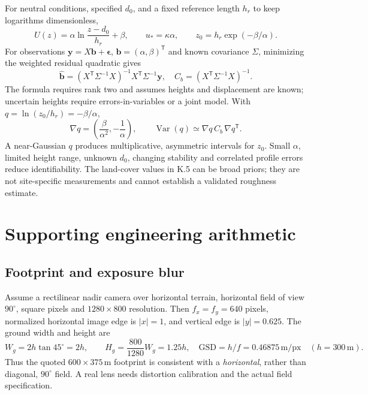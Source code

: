 For neutral conditions, specified $d_0$, and a fixed reference length
$h_r$ to keep logarithms dimensionless,
\begin{equation}
 U(z)=\alpha\ln\frac{z-d_0}{h_r}+\beta,
 \qquad u_*=\kappa\alpha,\qquad
 z_0=h_r\exp(-\beta/\alpha).
\end{equation}
For observations $\boldsymbol y=X\boldsymbol b+\boldsymbol\epsilon$,
$\boldsymbol b=(\alpha,\beta)^{\mathsf T}$ and known covariance $\Sigma$,
minimizing the weighted residual quadratic gives
\begin{equation}
 \widehat{\boldsymbol b}=(X^{\mathsf T}\Sigma^{-1}X)^{-1}
                   X^{\mathsf T}\Sigma^{-1}\boldsymbol y,
 \quad C_b=(X^{\mathsf T}\Sigma^{-1}X)^{-1}.
\end{equation}
The formula requires rank two and assumes heights and displacement are
known; uncertain heights require errors-in-variables or a joint model.
With $q=\ln(z_0/h_r)=-\beta/\alpha$,
\begin{equation}
 \nabla q=\left(\frac{\beta}{\alpha^2},-\frac1\alpha\right),
 \qquad \operatorname{Var}(q)\simeq\nabla q\,C_b\,\nabla q^{\mathsf T}.
\end{equation}
A near-Gaussian $q$ produces multiplicative, asymmetric intervals for
$z_0$. Small $\alpha$, limited height range, unknown $d_0$, changing
stability and correlated profile errors reduce identifiability. The
land-cover values in K.5 can be broad priors; they are not site-specific
measurements and cannot establish a validated roughness estimate.

\section{Supporting engineering arithmetic}
\label{sec:engineering}

\subsection{Footprint and exposure blur}

Assume a rectilinear nadir camera over horizontal terrain, horizontal
field of view $90^\circ$, square pixels and $1280\times800$ resolution.
Then $f_x=f_y=640$ pixels, normalized horizontal image edge is $|x|=1$,
and vertical edge is $|y|=0.625$. The ground width and height are
\begin{equation}
 W_g=2h\tan45^\circ=2h,\qquad
 H_g=\frac{800}{1280}W_g=1.25h,
 \quad \mathrm{GSD}=h/f=0.46875\,\mathrm{m/px}\quad(h=300\,\mathrm m).
\end{equation}
Thus the quoted $600\times375\,\mathrm m$ footprint is consistent with
a \emph{horizontal}, rather than diagonal, $90^\circ$ field. A real lens
needs distortion calibration and the actual field specification.

